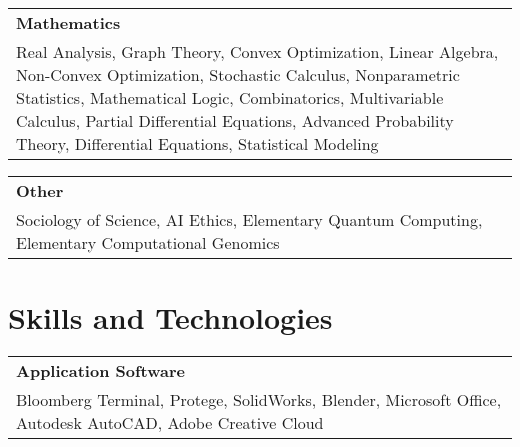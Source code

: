 \documentclass[10pt, letterpaper]{article}
\newcommand{\tabularxwidth}{\textwidth}
\begin{document}
    
        \begin{tabularx}{\tabularxwidth}{X}
            \textbf{Mathematics} \\
            
            Real Analysis, 
            Graph Theory, 
            Convex Optimization, 
            Linear Algebra, 
            Non-Convex Optimization, 
            Stochastic Calculus, 
            Nonparametric Statistics, 
            Mathematical Logic, 
            Combinatorics, 
            Multivariable Calculus, 
            Partial Differential Equations, 
            Advanced Probability Theory, 
            Differential Equations, 
            Statistical Modeling \\
        \end{tabularx}

        
            \vspace{.5em}
        

    
        \begin{tabularx}{\tabularxwidth}{X}
            \textbf{Other} \\
            
            Sociology of Science, 
            AI Ethics, 
            Elementary Quantum Computing, 
            Elementary Computational Genomics \\
        \end{tabularx}

        

    



    
        \section{Skills and Technologies}

    
        \begin{tabularx}{\tabularxwidth}{X}
            \textbf{Application Software} \\
            
            Bloomberg Terminal, 
            Protege, 
            SolidWorks, 
            Blender, 
            Microsoft Office, 
            Autodesk AutoCAD, 
            Adobe Creative Cloud \\
        \end{tabularx}
\end{document}
